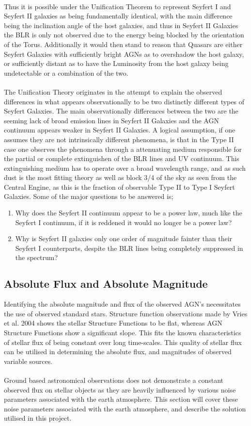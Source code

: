 \documentclass[a4paper, 12pt, twoside]{article}
\begin{document}
\\
Thus it is possible under the Unification Theorem to represent Seyfert I and Seyfert II galaxies as being fundamentally identical, with the main difference being the inclination angle of the host galaxies, and thus in Seyfert II Galaxies the BLR is only not observed due to the energy being blocked by the orientation of the Torus. Additionally it would then stand to reason that Quasars are either Seyfert Galaxies with sufficiently bright AGNs as to overshadow the host galaxy, or sufficiently distant as to have the Luminosity from the host galaxy being undetectable or a combination of the two. \\
\\
The Unification Theory originates in the attempt to explain the observed differences in what appears observationally to be two distinctly different types of Seyfert Galaxies. The main observationally differences between the two are the seeming lack of broad emission lines in Seyfert II Galaxies and the AGN continuum appears weaker in Seyfert II Galaxies. A logical assumption, if one assumes they are not intrinsically different phenomena, is that in the Type II case one observes the phenomena through a attenuating medium responsible for the partial or complete extinguishen of the BLR lines and UV continuum. This extinguishing medium has to operate over a broad wavelength range, and as such dust is the most fitting theory as well as block 3/4 of the sky as seen from the Central Engine, as this is the fraction of observable Type II to Type I Seyfert Galaxies. Some of the major questions to be answered is;
\begin{enumerate}
\item Why does the Seyfert II continuum appear to be a power law, much like the Seyfert I continuum, if it is reddened it would no longer be a power law?
\item Why is Seyfert II galaxies only one order of magnitude fainter than their Seyfert I counterparts, despite the BLR lines being completely suppressed in the spectrum?
\end{enumerate}

\subsection{Absolute Flux and Absolute Magnitude}
Identifying the absolute magnitude and flux of the observed AGN's necessitates the use of observed standard stars. Structure function observations made by Vries et al. 2004 shows the stellar Structure Functions to be flat, whereas AGN Structure Functions show a significant slope. This fits the known characteristics of stellar flux of being constant over long time-scales. This quality of stellar flux can be utilised in determining the absolute flux, and magnitudes of observed variable sources. \\
\\
Ground based astronomical observations does not demonstrate a constant observed flux on stellar objects as they are heavily influenced by various noise parameters associated with the earth atmosphere. This section will cover these noise parameters associated with the earth atmosphere, and describe the solution utilised in this project. \\
\end{document}
